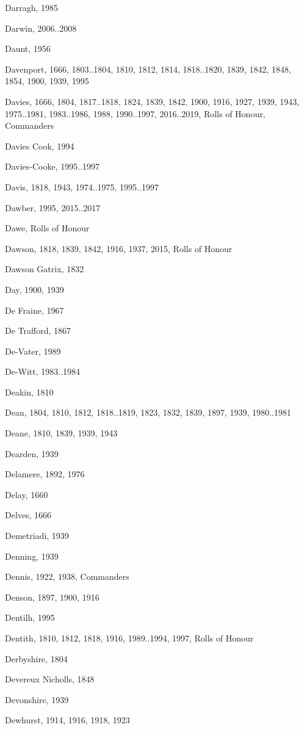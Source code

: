 \begin{theindex}
\item Darragh, 1985
\item Darwin, 2006..2008
\item Daunt, 1956
\item Davenport, 1666, 1803..1804, 1810, 1812, 1814, 1818..1820, 1839, 1842, 1848, 1854, 1900, 1939, 1995
\item Davies, 1666, 1804, 1817..1818, 1824, 1839, 1842, 1900, 1916, 1927, 1939, 1943, 1975..1981, 1983..1986, 1988, 1990..1997, 2016..2019, Rolls of Honour, Commanders
\item Davies Cook, 1994
\item Davies-Cooke, 1995..1997
\item Davis, 1818, 1943, 1974..1975, 1995..1997
\item Dawber, 1995, 2015..2017
\item Dawe, Rolls of Honour
\item Dawson, 1818, 1839, 1842, 1916, 1937, 2015, Rolls of Honour
\item Dawson Gatrix, 1832
\item Day, 1900, 1939
\item De Fraine, 1967
\item De Trafford, 1867
\item De-Vater, 1989
\item De-Witt, 1983..1984
\item Deakin, 1810
\item Dean, 1804, 1810, 1812, 1818..1819, 1823, 1832, 1839, 1897, 1939, 1980..1981
\item Deane, 1810, 1839, 1939, 1943
\item Dearden, 1939
\item Delamere, 1892, 1976
\item Delay, 1660
\item Delves, 1666
\item Demetriadi, 1939
\item Denning, 1939
\item Dennis, 1922, 1938, Commanders
\item Denson, 1897, 1900, 1916
\item Dentilh, 1995
\item Dentith, 1810, 1812, 1818, 1916, 1989..1994, 1997, Rolls of Honour
\item Derbyshire, 1804
\item Devereux Nicholls, 1848
\item Devonshire, 1939
\item Dewhurst, 1914, 1916, 1918, 1923

\end{theindex}
